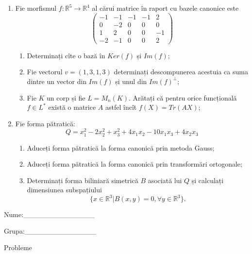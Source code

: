 \documentclass{article}
\begin{document}
\begin{enumerate}
 \item Fie morfismul $f:\mathbb{R}^5 \to \mathbb{R}^4$ al cărui matrice în raport cu bazele canonice este
$$\begin{pmatrix}
-1&-1&-1&-1&2\\
0&-2&0&0&0\\
1&2&0&0&-1\\
-2&-1&0&0&2
\end{pmatrix}$$

\begin{enumerate}
\item Determinați cîte o bază în $Ker(f)$ și $Im(f)$;
\item Fie vectorul $v=(1,3,1,3)$ determinați descompunerea acestuia ca suma dintre un vector din $Im(f)$ și unul din $Im(f)^\perp$;
\item Fie $K$ un corp și fie $L=M_n(K)$. Arătați că pentru orice funcțională $f \in L^*$ există o matrice $A$ astfel încît $f(X)=Tr(AX)$;
\end{enumerate}
\item Fie forma pătratică:
$$Q= x_1^2-2x_2^2+x_3^2+4x_1x_2-10x_1x_3+4x_2x_3$$

\begin{enumerate}
\item Aduceți forma pătratică la forma canonică prin metoda Gauss;
\item Aduceți forma pătratică la forma canonică prin transformări ortogonale;
\item Determinați forma biliniară simetrică $B$ asociată lui $Q$ și calculați dimensiunea subspațiului
$$\{x \in \mathbb{R}^3 | B(x,y)=0,\forall y \in \mathbb{R}^3\}.$$

\end{enumerate}
\end{enumerate}
\newpage
\begin{flushright}
Nume:\_\_\_\_\_\_\_\_\_\_\_\_\_\_
 
 
Grupa:\_\_\_\_\_\_\_\_\_\_\_\_\_\_
\end{flushright}
\begin{center}
\vspace{2cm}
{\Large Probleme}
\vspace{2cm}
\end{center}
\end{document}
